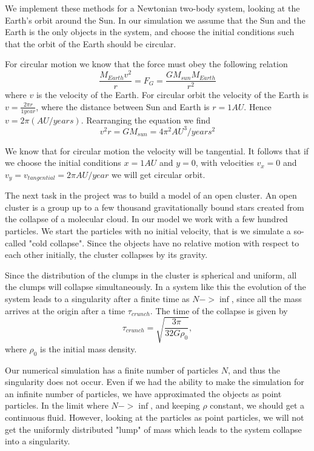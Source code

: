 \documentclass[a4paper,12pt, english]{article}
\begin{document}
We implement these methods for a Newtonian two-body system, looking at the Earth's orbit around the Sun. In our simulation we assume that the Sun and the Earth is the only objects in the system, and choose the initial conditions such that the orbit of the Earth should be circular.

For circular motion we know that the force must obey the following relation 
$$\frac{M_{Earth}v^2}{r} = F_G = \frac{GM_{sun}M_{Earth}}{r^2}$$ where $v$ is the velocity of the Earth. 
For circular orbit the velocity of the Earth is $v = \frac{2 \pi r}{1 year}$, where the distance between Sun and Earth is $r = 1 AU$. Hence $v = 2 \pi (AU/years)$. Rearranging the equation we find
$$v^2r = GM_{sun} = 4 \pi ^2 AU^3/years^2$$

We know that for circular motion the velocity will be tangential. It follows that if we choose the initial conditions $ x = 1 AU $ and $ y = 0$, with velocities $v_x = 0$ and $v_y = v_{tangential} = 2 \pi AU/year$ we will get circular orbit.    

The next task in the project was to build a model of an open cluster. An open cluster is a group up to a few thousand gravitationally bound stars created from the collapse of a molecular cloud. In our model we work with a few hundred particles. We start the particles with no initial velocity, that is we simulate a so-called "cold collapse". Since the objects have no relative motion with respect to each other initially, the cluster collapses by its gravity. 

Since the distribution of the clumps in the cluster is spherical and uniform, all the clumps will collapse simultaneously.
In a system like this the evolution of the system leads to a singularity after a finite time as $N -> \inf$, since all the mass arrives at the origin after a time $\tau_{crunch}$. The time of the collapse is given by $$\tau_{crunch} = \sqrt{\frac{3 \pi}{32G \rho_0}},$$ where $\rho_0$ is the initial mass density. 

Our numerical simulation has a finite number of particles $N$, and thus the singularity does not occur. Even if we had the ability to make the simulation for an infinite number of particles, we have approximated the objects as point particles. In the limit where $N -> \inf$, and keeping $\rho$ constant, we should get a continuous fluid. However, looking at the particles as point particles, we will not get the uniformly distributed "lump" of mass which leads to the system collapse into a singularity.     
\end{document}
